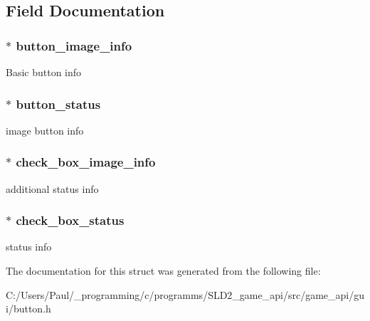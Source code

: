 \subsection{Field Documentation}
\hypertarget{struct__check__box_abe7ec1033c8966c23ea31920649178bf}{
\subsubsection[{button\+\_\+image\+\_\+info}]{$\ast$ button\+\_\+image\+\_\+info}}\label{struct__check__box_abe7ec1033c8966c23ea31920649178bf}
Basic button info \hypertarget{struct__check__box_af1ab6c7287e67a55a8e855e08302f8be}{
\subsubsection[{button\+\_\+status}]{$\ast$ button\+\_\+status}}\label{struct__check__box_af1ab6c7287e67a55a8e855e08302f8be}
image button info \hypertarget{struct__check__box_a229649d419b5ff48d15261585e275619}{
\subsubsection[{check\+\_\+box\+\_\+image\+\_\+info}]{$\ast$ check\+\_\+box\+\_\+image\+\_\+info}}\label{struct__check__box_a229649d419b5ff48d15261585e275619}
additional status info \hypertarget{struct__check__box_ad26008f10118371ca26980a69e0c380b}{
\subsubsection[{check\+\_\+box\+\_\+status}]{$\ast$ check\+\_\+box\+\_\+status}}\label{struct__check__box_ad26008f10118371ca26980a69e0c380b}
status info 

The documentation for this struct was generated from the following file\+:\begin{DoxyCompactItemize}
\item 
C\+:/\+Users/\+Paul/\+\_\+programming/c/programms/\+S\+L\+D2\+\_\+game\+\_\+api/src/game\+\_\+api/gui/button.\+h\end{DoxyCompactItemize}
